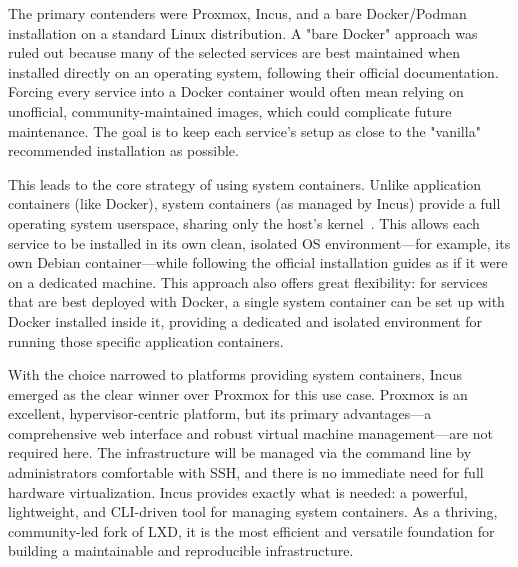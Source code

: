 The primary contenders were Proxmox, Incus, and a bare Docker/Podman installation on a standard Linux distribution. A "bare Docker" approach was ruled out because many of the selected services are best maintained when installed directly on an operating system, following their official documentation. Forcing every service into a Docker container would often mean relying on unofficial, community-maintained images, which could complicate future maintenance. The goal is to keep each service's setup as close to the "vanilla" recommended installation as possible.

This leads to the core strategy of using system containers. Unlike application containers (like Docker), system containers (as managed by Incus) provide a full operating system userspace, sharing only the host's kernel~\cite{incus-linux-containers-2023}. This allows each service to be installed in its own clean, isolated OS environment—for example, its own Debian container—while following the official installation guides as if it were on a dedicated machine. This approach also offers great flexibility: for services that are best deployed with Docker, a single system container can be set up with Docker installed inside it, providing a dedicated and isolated environment for running those specific application containers.

With the choice narrowed to platforms providing system containers, Incus emerged as the clear winner over Proxmox for this use case. Proxmox is an excellent, hypervisor-centric platform, but its primary advantages—a comprehensive web interface and robust virtual machine management—are not required here. The infrastructure will be managed via the command line by administrators comfortable with SSH, and there is no immediate need for full hardware virtualization. Incus provides exactly what is needed: a powerful, lightweight, and CLI-driven tool for managing system containers. As a thriving, community-led fork of LXD, it is the most efficient and versatile foundation for building a maintainable and reproducible infrastructure.
